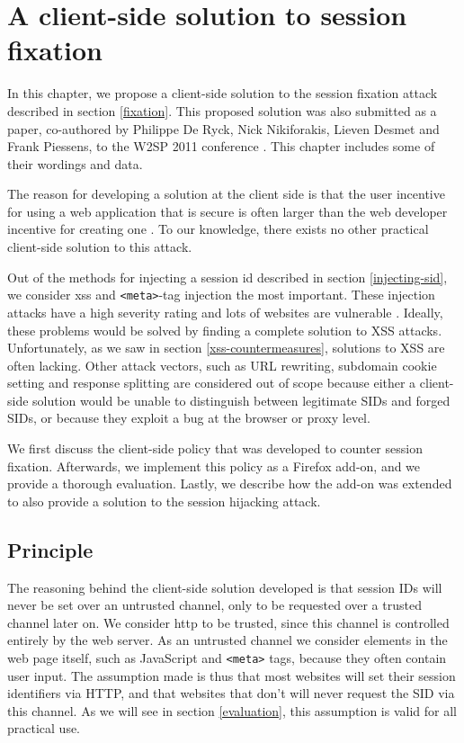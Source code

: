 \chapter{A client-side solution to session fixation}\label{fixation-solution}
In this chapter, we propose a client-side solution to the \gls{session fixation} attack described in section \ref{fixation}. This proposed solution was also submitted as a paper, co-authored by Philippe De Ryck, Nick Nikiforakis, Lieven Desmet and Frank Piessens, to the W2SP 2011 conference \cite{Bonne2011}. This chapter includes some of their wordings and data.

The reason for developing a solution at the client side is that the user incentive for using a web application that is secure is often larger than the web developer incentive for creating one \cite{Johns2011}. To our knowledge, there exists no other practical client-side solution to this attack.

Out of the methods for injecting a \gls{session id} described in section \ref{injecting-sid}, we consider \gls{xss} and \texttt{<meta>}-tag injection the most important. These injection attacks have a high severity rating \cite{Williams2010} and lots of websites are vulnerable \cite{Brown2010}. Ideally, these problems would be solved by finding a complete solution to XSS attacks. Unfortunately, as we saw in section \ref{xss-countermeasures}, solutions to XSS are often lacking. Other attack vectors, such as URL rewriting, subdomain cookie setting and response splitting are considered out of scope because either a client-side solution would be unable to distinguish between legitimate SIDs and forged SIDs, or because they exploit a bug at the browser or proxy level.

We first discuss the client-side policy that was developed to counter session fixation. Afterwards, we implement this policy as a Firefox add-on, and we provide a thorough evaluation. Lastly, we describe how the add-on was extended to also provide a solution to the session hijacking attack.

\section{Principle}

The reasoning behind the client-side solution developed is that session IDs will never be set over an untrusted channel, only to be requested over a trusted channel later on. We consider \gls{http} to be trusted, since this channel is controlled entirely by the web server. As an untrusted channel we consider elements in the web page itself, such as JavaScript and \texttt{<meta>} tags, because they often contain user input. The assumption made is thus that most websites will set their session identifiers via HTTP, and that websites that don't will never request the SID via this channel. As we will see in section \ref{evaluation}, this assumption is valid for all practical use.

